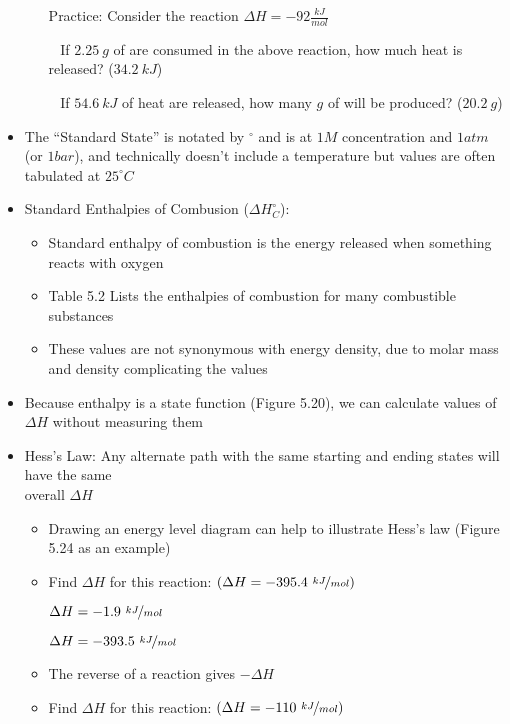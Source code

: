 \documentclass[12pt, openany, letterpaper]{memoir}
\begin{document}
\begin{itemize}
\begin{itemize}
          Practice: Consider the reaction  $\Delta H = -92\frac{kJ}{mol}$

          ~\hphantom{Practice:} If $2.25~g$ of  are consumed in the above reaction, how much heat is released? ($34.2~kJ$)

          ~\hphantom{Practice:} If $54.6~kJ$ of heat are released, how many $g$ of  will be produced? ($20.2~g$)
  \end{itemize}
  \item The ``Standard State'' is notated by $^\circ$ and is at $1M$ concentration and $1atm$ (or $1bar$), and technically doesn't include a temperature but values are often tabulated at $25^\circ C$
  \item Standard Enthalpies of Combusion ($\Delta H^\circ_C$):
    \begin{itemize}
      \item Standard enthalpy of combustion is the energy released when something reacts with oxygen
      \item Table 5.2 Lists the enthalpies of combustion for many combustible substances
      \item These values are not synonymous with energy density, due to molar mass and density complicating the values
    \end{itemize}
  \item Because enthalpy is a state function (Figure 5.20), we can calculate values of $\Delta H$ without measuring them
  \item Hess's Law: Any alternate path with the same starting and ending states will have the same\\overall $\Delta H$
  \begin{itemize}
    \item Drawing an energy level diagram can help to illustrate Hess's law (Figure 5.24 as an example)
    \item Find $\Delta H$ for this reaction:  \hspace{1em} $\left(\Delta H=-395.4~\nicefrac{kJ}{mol}\right)$

           \hspace{2em} $\Delta H=-1.9~\nicefrac{kJ}{mol}$

           \hspace{2em} $\Delta H=-393.5~\nicefrac{kJ}{mol}$
    \item The reverse of a reaction gives $-\Delta H$
    \item Find $\Delta H$ for this reaction:  \hspace{1em} $\left(\Delta H=-110~\nicefrac{kJ}{mol}\right)$


\end{itemize}
\end{itemize}
\end{document}
